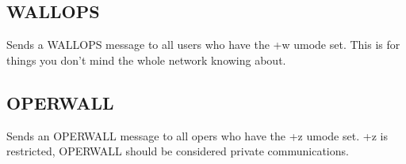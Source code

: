 \subsection{WALLOPS}

    \literal{:}

	Sends a WALLOPS message to all users who have the +w umode set. This is
	for things you don't mind the whole network knowing about.


\subsection{OPERWALL}

    \literal{:}

	Sends an OPERWALL message to all opers who have the +z umode set. +z is
	restricted, OPERWALL should be considered private communications.

